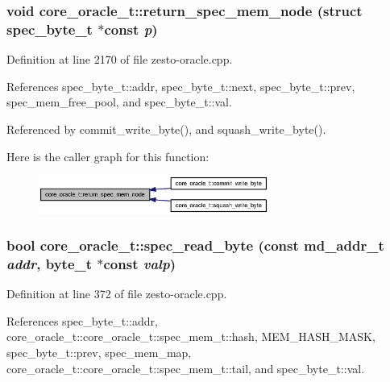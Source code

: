 \subsubsection[{return\_\-spec\_\-mem\_\-node}]{\setlength{\rightskip}{0pt plus 5cm}void core\_\-oracle\_\-t::return\_\-spec\_\-mem\_\-node (struct {\bf spec\_\-byte\_\-t} $\ast$const  {\em p})\hspace{0.3cm}{\tt  [protected]}}\label{classcore__oracle__t_ecb0129c38db27a8d8424d8171025145}




Definition at line 2170 of file zesto-oracle.cpp.

References spec\_\-byte\_\-t::addr, spec\_\-byte\_\-t::next, spec\_\-byte\_\-t::prev, spec\_\-mem\_\-free\_\-pool, and spec\_\-byte\_\-t::val.

Referenced by commit\_\-write\_\-byte(), and squash\_\-write\_\-byte().

Here is the caller graph for this function:\nopagebreak
\begin{figure}[H]
\begin{center}
\leavevmode
\includegraphics[width=214pt]{classcore__oracle__t_ecb0129c38db27a8d8424d8171025145_icgraph}
\end{center}
\end{figure}
\subsubsection[{spec\_\-read\_\-byte}]{\setlength{\rightskip}{0pt plus 5cm}bool core\_\-oracle\_\-t::spec\_\-read\_\-byte (const {\bf md\_\-addr\_\-t} {\em addr}, \/  {\bf byte\_\-t} $\ast$const  {\em valp})}\label{classcore__oracle__t_24e69274c807607f5ef86295f46eafbf}




Definition at line 372 of file zesto-oracle.cpp.

References spec\_\-byte\_\-t::addr, core\_\-oracle\_\-t::core\_\-oracle\_\-t::spec\_\-mem\_\-t::hash, MEM\_\-HASH\_\-MASK, spec\_\-byte\_\-t::prev, spec\_\-mem\_\-map, core\_\-oracle\_\-t::core\_\-oracle\_\-t::spec\_\-mem\_\-t::tail, and spec\_\-byte\_\-t::val.
